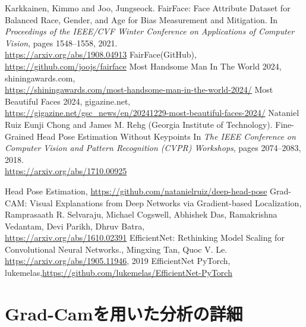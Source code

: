 \documentclass[a4paper,11pt,titlepage]{jsarticle}
\begin{document}
\begin{thebibliography}{9}
    Karkkainen, Kimmo and Joo, Jungseock.
    FairFace: Face Attribute Dataset for Balanced Race, Gender, and Age for Bias Measurement and Mitigation.
    In \textit{Proceedings of the IEEE/CVF Winter Conference on Applications of Computer Vision}, pages 1548--1558, 2021.\\
        \url{https://arxiv.org/abs/1908.04913}
      FairFace(GitHub), \url{https://github.com/joojs/fairface}
    Most Handsome Man In The World 2024, shiningawards.com, \\
    \url{https://shiningawards.com/most-handsome-man-in-the-world-2024/}
    Most Beautiful Faces 2024, gigazine.net, \\ \url{https://gigazine.net/gsc_news/en/20241229-most-beautiful-faces-2024/}
        Nataniel Ruiz Eunji Chong and James M. Rehg (Georgia Institute of Technology).
        Fine-Grained Head Pose Estimation Without Keypoints
         In \textit{The IEEE Conference on Computer Vision and Pattern Recognition (CVPR) Workshops}, pages 2074--2083, 2018. \\
          \url{https://arxiv.org/abs/1710.00925}

    Head Pose Estimation, \url{https://github.com/natanielruiz/deep-head-pose}
    Grad-CAM: Visual Explanations from Deep Networks via Gradient-based Localization, 
    Ramprasaath R. Selvaraju, Michael Cogswell, Abhishek Das, Ramakrishna Vedantam, Devi Parikh, Dhruv Batra,\\
    \url{https://arxiv.org/abs/1610.02391}  
  EfficientNet: Rethinking Model Scaling for Convolutional Neural Networks., Mingxing Tan, Quoc V. Le. 
 	\url{https://arxiv.org/abs/1905.11946}, 2019
  EfficientNet PyTorch, lukemelas,\url{https://github.com/lukemelas/EfficientNet-PyTorch}
\end{thebibliography}



\clearpage
\appendix 
\section{Grad-Camを用いた分析の詳細}
\end{document}
